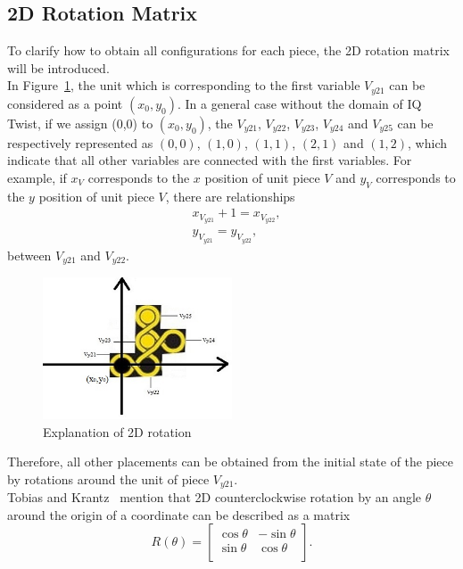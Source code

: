 \subsection{2D Rotation Matrix}
\label{section:2Drotationmatrix}
To clarify how to obtain all configurations for each piece, the 2D rotation matrix will be introduced. 
\\In Figure~\ref{fig:explanation2D}, the unit which is corresponding to the first variable $V_{y21}$ can be considered as a point $(x_{0},y_{0})$. In a general case without the domain of IQ Twist, if we assign (0,0) to $(x_{0},y_{0})$, the $V_{y21}$, $V_{y22}$, $V_{y23}$, $V_{y24}$ and $V_{y25}$ can be respectively represented as $(0,0)$, $(1,0)$, $(1,1)$, $(2,1)$ and $(1,2)$, which indicate that all other variables are connected with the first variables. For example, if $x_{V}$ corresponds to the $x$ position of unit piece $V$ and $y_{V}$ corresponds to the $y$ position of unit piece $V$, there are relationships
\begin{equation}
\begin{aligned}
&x_{V_{y21}}+1=x_{V_{y22}},\\
&y_{V_{y21}}=y_{V_{y22}},
\end{aligned}
\end{equation}
between $V_{y21}$ and $V_{y22}$.
\begin{figure}[htbp]
\centering
\includegraphics[width=0.5\textwidth]{figs/explanation2D.jpg}
\caption{Explanation of 2D rotation}
    \label{fig:explanation2D}
\end{figure}
Therefore, all other placements can be obtained from the initial state of the piece by rotations around the unit of piece $V_{y21}$.\\
Tobias and Krantz~\cite{r9} mention that 2D counterclockwise rotation by an angle $\theta$ around the origin of a coordinate can be described as a matrix
\begin{equation}
R(\theta)=\begin{bmatrix}
\cos\theta & -\sin\theta\\
\sin\theta & \cos\theta\\
\end{bmatrix}.
\end{equation}
